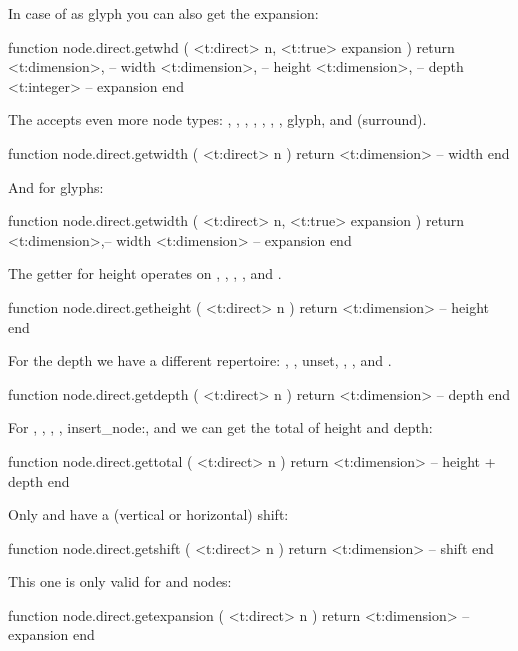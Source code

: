 In case of as glyph you can also get the expansion:

\starttyping[option=LUA]
function node.direct.getwhd ( <t:direct> n, <t:true> expansion )
    return
        <t:dimension>, -- width
        <t:dimension>, -- height
        <t:dimension>, -- depth
        <t:integer>    -- expansion
end
\stoptyping

The  accepts even more node types: , ,
, , , , , \type
{glyph},  and  (surround).

\starttyping[option=LUA]
function node.direct.getwidth ( <t:direct> n )
    return <t:dimension> -- width
end
\stoptyping

And for glyphs:

\starttyping[option=LUA]
function node.direct.getwidth ( <t:direct> n, <t:true> expansion )
    return
        <t:dimension>,-- width
        <t:dimension> -- expansion
end
\stoptyping

The getter for height operates on , , ,
,  and .

\starttyping[option=LUA]
function node.direct.getheight ( <t:direct> n )
    return <t:dimension> -- height
end
\stoptyping

For the depth we have a different repertoire: , , \type
{unset}, , ,  and .

\starttyping[option=LUA]
function node.direct.getdepth ( <t:direct> n )
    return <t:dimension> -- depth
end
\stoptyping

For , , , , \type
{insert_node:},  and  we can get the total of height
and depth:

\starttyping[option=LUA]
function node.direct.gettotal ( <t:direct> n )
    return <t:dimension> -- height + depth
end
\stoptyping

Only  and  have a (vertical or horizontal) shift:

\starttyping[option=LUA]
function node.direct.getshift ( <t:direct> n )
    return <t:dimension> -- shift
end
\stoptyping

This one is only valid for  and  nodes:

\starttyping[option=LUA]
function node.direct.getexpansion ( <t:direct> n )
    return <t:dimension> -- expansion
end
\stoptyping

